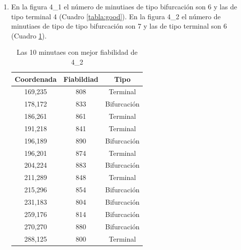 \documentclass[10pt,a4paper]{article}
\begin{document}
\begin{enumerate}[label=\textbf{\alph*)}]
\item En la figura 4\_1 el número de minutiaes de tipo bifurcación son 6 y las de tipo terminal 4 (Cuadro \ref{tabla:good}). En la figura 4\_2 el número de minutiaes de tipo de tipo bifurcación son 7 y las de tipo terminal son 6 (Cuadro \ref{tabla:good4_2}).
\begin{table}[h!]
\centering
\begin{tabular}{|c|c|c|}
\hline
 \textbf{Coordenada} & \textbf{Fiabildiad} & \textbf{Tipo}\\ \hline
 169,235 & 808 & Terminal\\ \hline
 178,172 & 833 & Bifurcación\\ \hline
 186,261 & 861 & Terminal\\ \hline
 191,218 & 841 & Terminal\\ \hline
 196,189 & 890 & Bifurcación\\ \hline
 196,201 & 874 & Terminal\\ \hline
 204,224 & 883 & Bifurcación\\ \hline
 211,289 & 848 & Terminal\\ \hline
 215,296 & 854 & Bifurcación\\ \hline
 231,183 & 804 & Bifurcación\\ \hline
 259,176 & 814 & Bifurcación\\ \hline
 270,270 & 880 & Bifurcación\\ \hline
 288,125 & 800 & Terminal\\ \hline
 
\end{tabular}
  \caption{Las 10 minutaes con mejor fiabilidad de 4\_2}
  \label{tabla:good4_2}
\end{table}


\end{enumerate}
\end{document}
